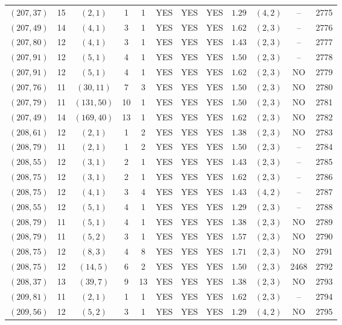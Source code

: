\begin{longtable}{|c|c|c|c|c|c|c|c|c|c|c|c|}
$(207,37)$ & 15 & $(2,1)$ & 1 & 1 & YES & YES & YES & $1.29$ & $(4,2)$ & -- & 2775\\
$(207,49)$ & 14 & $(4,1)$ & 3 & 1 & YES & YES & YES & $1.62$ & $(2,3)$ & -- & 2776\\
$(207,80)$ & 12 & $(4,1)$ & 3 & 1 & YES & YES & YES & $1.43$ & $(2,3)$ & -- & 2777\\
$(207,91)$ & 12 & $(5,1)$ & 4 & 1 & YES & YES & YES & $1.50$ & $(2,3)$ & -- & 2778\\
$(207,91)$ & 12 & $(5,1)$ & 4 & 1 & YES & YES & YES & $1.62$ & $(2,3)$ & NO & 2779\\
$(207,76)$ & 11 & $(30,11)$ & 7 & 3 & YES & YES & YES & $1.50$ & $(2,3)$ & NO & 2780\\
$(207,79)$ & 11 & $(131,50)$ & 10 & 1 & YES & YES & YES & $1.50$ & $(2,3)$ & NO & 2781\\
$(207,49)$ & 14 & $(169,40)$ & 13 & 1 & YES & YES & YES & $1.62$ & $(2,3)$ & NO & 2782\\
$(208,61)$ & 12 & $(2,1)$ & 1 & 2 & YES & YES & YES & $1.38$ & $(2,3)$ & NO & 2783\\
$(208,79)$ & 11 & $(2,1)$ & 1 & 2 & YES & YES & YES & $1.50$ & $(2,3)$ & -- & 2784\\
$(208,55)$ & 12 & $(3,1)$ & 2 & 1 & YES & YES & YES & $1.43$ & $(2,3)$ & -- & 2785\\
$(208,75)$ & 12 & $(3,1)$ & 2 & 1 & YES & YES & YES & $1.62$ & $(2,3)$ & -- & 2786\\
$(208,75)$ & 12 & $(4,1)$ & 3 & 4 & YES & YES & YES & $1.43$ & $(4,2)$ & -- & 2787\\
$(208,55)$ & 12 & $(5,1)$ & 4 & 1 & YES & YES & YES & $1.29$ & $(2,3)$ & -- & 2788\\
$(208,79)$ & 11 & $(5,1)$ & 4 & 1 & YES & YES & YES & $1.38$ & $(2,3)$ & NO & 2789\\
$(208,79)$ & 11 & $(5,2)$ & 3 & 1 & YES & YES & YES & $1.57$ & $(2,3)$ & NO & 2790\\
$(208,75)$ & 12 & $(8,3)$ & 4 & 8 & YES & YES & YES & $1.71$ & $(2,3)$ & NO & 2791\\
$(208,75)$ & 12 & $(14,5)$ & 6 & 2 & YES & YES & YES & $1.50$ & $(2,3)$ & 2468 & 2792\\
$(208,37)$ & 13 & $(39,7)$ & 9 & 13 & YES & YES & YES & $1.38$ & $(2,3)$ & NO & 2793\\
$(209,81)$ & 11 & $(2,1)$ & 1 & 1 & YES & YES & YES & $1.62$ & $(2,3)$ & -- & 2794\\
$(209,56)$ & 12 & $(5,2)$ & 3 & 1 & YES & YES & YES & $1.29$ & $(4,2)$ & NO & 2795\\

\end{longtable}
